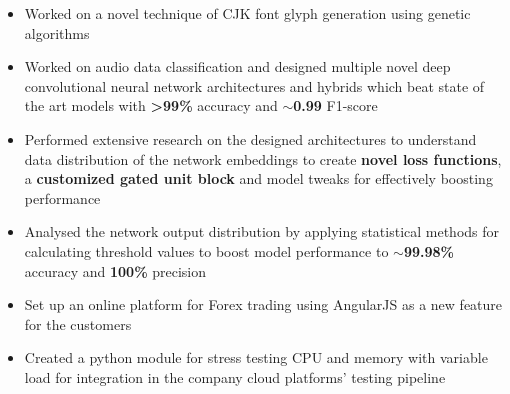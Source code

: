 \documentclass[10pt,a4paper,ragged2e,withhyper]{altacv}
\begin{document}
\begin{paracol}{2}

\begin{itemize}
    \item Worked on a novel technique of CJK font glyph generation using genetic algorithms
\end{itemize}
\divider
{}
\begin{itemize}
    \item Worked on audio data classification and designed multiple novel deep convolutional neural network architectures and hybrids which beat state of the art models with \textbf{>99\%} accuracy and \textbf{$\sim$0.99} F1-score
    \item Performed extensive research on the designed architectures to understand data distribution of the network embeddings to create \textbf{novel loss functions}, a \textbf{customized gated unit block} and model tweaks for effectively boosting performance
    \item Analysed the network output distribution by applying statistical methods for calculating threshold values to boost model performance to \textbf{$\sim$99.98\%} accuracy and \textbf{100\%} precision
\end{itemize}
\divider
{}
\begin{itemize}
\item Set up an online platform for Forex trading using AngularJS as a new feature for the customers
\item Created a python module for stress testing CPU and memory with variable load for integration in the company cloud platforms' testing pipeline
\end{itemize}

\begin{comment}
\cvsection{Technical Skills}
\cvskill{C/C++, Python, Java}{4}
\cvskill{Deep Learning}{4}
\cvskill{Computer Vision}{4}
\cvskill{Machine Learning}{3}
\cvskill{Databases}{3}
\cvskill{Robotics}{3}
\cvskill{Web Development}{2}
\end{comment}



\end{paracol}
\end{document}
